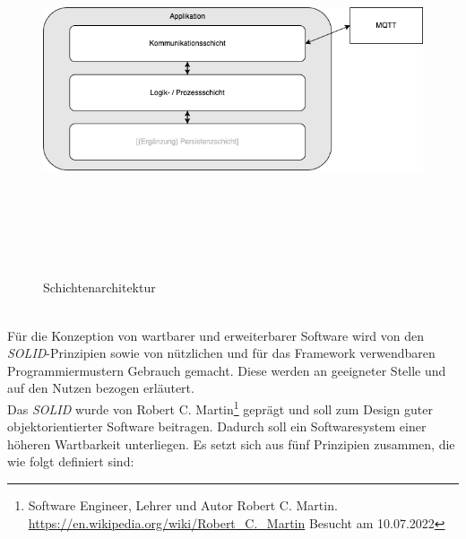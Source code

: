     \begin{figure}[hbt!]
        \centering
        \includegraphics[width=14cm,height=11cm,keepaspectratio]{images/Schichtenarchitektur.png}
        \caption{Schichtenarchitektur}
        \label{fig:schichtenarchitektur}
    \end{figure}
    \\
    Für die Konzeption von wartbarer und erweiterbarer Software wird von den \textit{SOLID}-Prinzipien sowie von nützlichen 
    und für das Framework verwendbaren Programmiermustern Gebrauch gemacht. Diese werden an geeigneter Stelle und auf den Nutzen bezogen erläutert.
    \\
    \linebreak
    Das \textit{SOLID} wurde von Robert C. Martin\footnote{Software Engineer, Lehrer und Autor Robert C. Martin. \url{https://en.wikipedia.org/wiki/Robert_C._Martin} Besucht am 10.07.2022} 
    geprägt und soll zum Design guter objektorientierter Software beitragen. Dadurch soll 
    ein Softwaresystem einer höheren Wartbarkeit unterliegen. Es setzt sich aus fünf Prinzipien zusammen, %
    die wie folgt definiert sind:
